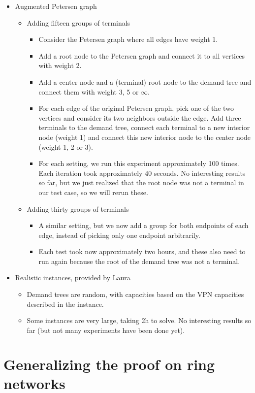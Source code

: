 \documentclass[11pt]{article}
\begin{document}
\begin{itemize}
        \item Augmented Petersen graph
        \begin{itemize}
            \item Adding fifteen groups of terminals
            \begin{itemize}
                \item Consider the Petersen graph where all edges have weight 1.
                \item Add a root node to the Petersen graph and connect it to all vertices with weight 2.
                \item Add a center node and a (terminal) root node to the demand tree and connect them with weight 3, 5 or $\infty$.
                \item For each edge of the original Petersen graph, pick one of the two vertices and consider its two neighbors outside the edge.
                Add three terminals to the demand tree, connect each terminal to a new interior node (weight 1) and connect this new interior node to the center node (weight 1, 2 or 3).
                \item For each setting, we run this experiment approximately 100 times.
                Each iteration took approximately 40 seconds.
                No interesting results so far, but we just realized that the root node was not a terminal in our test case, so we will rerun these.
            \end{itemize}
            \item Adding thirty groups of terminals
            \begin{itemize}
                \item A similar setting, but we now add a group for both endpoints of each edge, instead of picking only one endpoint arbitrarily.
                \item Each test took now approximately two hours, and these also need to run again because the root of the demand tree was not a terminal.
            \end{itemize}

        \end{itemize}

        \item Realistic instances, provided by Laura
        \begin{itemize}
            \item Demand trees are random, with capacities based on the VPN capacities described in the instance.
            \item Some instances are very large, taking 2h to solve.
            No interesting results so far (but not many experiments have been done yet).
        \end{itemize}
    \end{itemize}


    \section{Generalizing the proof on ring networks}
\end{document}
